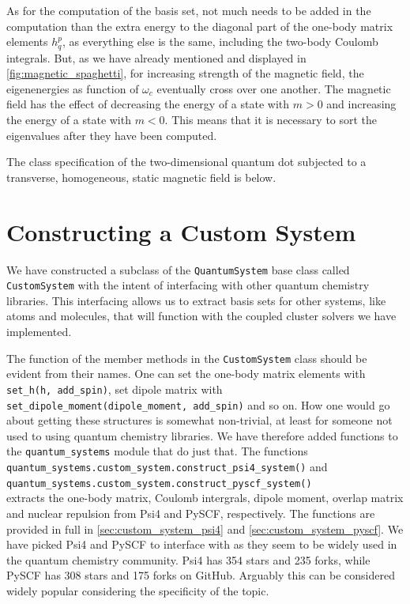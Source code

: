 As for the computation of the basis set, not much needs to be added in the computation 
than the extra energy to the diagonal part of the one-body matrix elements $h^p_q$, as 
everything else is the same, including the two-body Coulomb integrals. But, as we have 
already mentioned and displayed in \autoref{fig:magnetic_spaghetti}, for increasing 
strength of the magnetic field, the eigenenergies as function  of $\omega_c$ eventually 
cross over one another. The magnetic field has the effect of decreasing the energy of
a state with $m>0$ and increasing the energy of a state with $m<0$. This means that 
it is necessary to sort the eigenvalues after they have been computed. 

The class specification of the two-dimensional quantum dot subjected to a transverse,
homogeneous, static magnetic field is below.


\section{Constructing a Custom System}

We have constructed a subclass of the \lstinline{QuantumSystem} base 
class called \lstinline{CustomSystem} with the intent of interfacing with 
other quantum chemistry libraries. This interfacing allows us to extract basis 
sets for other systems, like atoms and molecules, that will function with the
coupled cluster solvers we have implemented.

The function of the member methods in the \lstinline{CustomSystem} class
should be evident from their names. One can set the one-body matrix elements with 
\lstinline{set_h(h, add_spin)}, set dipole matrix with 
\lstinline{set_dipole_moment(dipole_moment, add_spin)} and so on. How one would go about 
getting these structures is somewhat non-trivial, at least for someone not used 
to using quantum chemistry libraries. We have therefore added functions 
to the \lstinline{quantum_systems} module that do just that. The functions \\
\indent\lstinline{quantum_systems.custom_system.construct_psi4_system()} and \\
\indent\lstinline{quantum_systems.custom_system.construct_pyscf_system()} \\
extracts the one-body matrix, Coulomb intergrals, dipole moment, overlap matrix and
nuclear repulsion from Psi4\cite{parrish2017psi4} and PySCF\cite{PYSCF}, respectively.
The functions are provided in full in \autoref{sec:custom_system_psi4} and 
\autoref{sec:custom_system_pyscf}.
We have picked Psi4 and PySCF to interface with as they seem to be widely used in the 
quantum chemistry community. Psi4 has 354 stars and 235 forks, while PySCF has 308 stars
and 175 forks on GitHub. Arguably this can be considered  widely popular considering 
the specificity of the topic.

